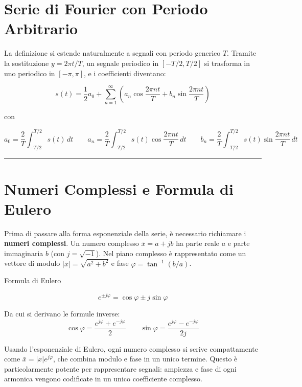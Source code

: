 \documentclass[
  italian,
  openany]{book}
\begin{document}
\section{Serie di Fourier con Periodo
Arbitrario}\label{serie-di-fourier-con-periodo-arbitrario}

La definizione si estende naturalmente a segnali con periodo generico
\(T\). Tramite la sostituzione \(y = 2\pi t / T\), un segnale periodico
in \([-T/2, T/2]\) si trasforma in uno periodico in \([-\pi, \pi]\), e i
coefficienti diventano:

\[s(t) = \frac{1}{2} a_0 + \sum_{n=1}^{\infty} \left( a_n \cos\frac{2\pi n t}{T} + b_n \sin\frac{2\pi n t}{T} \right)\]

con

\[a_0 = \frac{2}{T} \int_{-T/2}^{T/2} s(t)\, dt \qquad a_n = \frac{2}{T} \int_{-T/2}^{T/2} s(t) \cos\frac{2\pi n t}{T}\, dt \qquad b_n = \frac{2}{T} \int_{-T/2}^{T/2} s(t) \sin\frac{2\pi n t}{T}\, dt\]

\begin{center}\rule{0.5\linewidth}{0.5pt}\end{center}

\section{Numeri Complessi e Formula di
Eulero}\label{numeri-complessi-e-formula-di-eulero}

Prima di passare alla forma esponenziale della serie, è necessario
richiamare i \textbf{numeri complessi}. Un numero complesso
\(\bar{x} = a + jb\) ha parte reale \(a\) e parte immaginaria \(b\) (con
\(j = \sqrt{-1}\)). Nel piano complesso è rappresentato come un vettore
di modulo \(|\bar{x}| = \sqrt{a^2 + b^2}\) e fase
\(\varphi = \tan^{-1}(b/a)\).

\begin{calloutdefinition}{Formula di Eulero}

\[e^{\pm j\varphi} = \cos\varphi \pm j\sin\varphi\]

Da cui si derivano le formule inverse:
\[\cos\varphi = \frac{e^{j\varphi} + e^{-j\varphi}}{2} \qquad \sin\varphi = \frac{e^{j\varphi} - e^{-j\varphi}}{2j}\]

\end{calloutdefinition}

Usando l'esponenziale di Eulero, ogni numero complesso si scrive
compattamente come \(\bar{x} = |x| e^{j\varphi}\), che combina modulo e
fase in un unico termine. Questo è particolarmente potente per
rappresentare segnali: ampiezza e fase di ogni armonica vengono
codificate in un unico coefficiente complesso.
\end{document}
